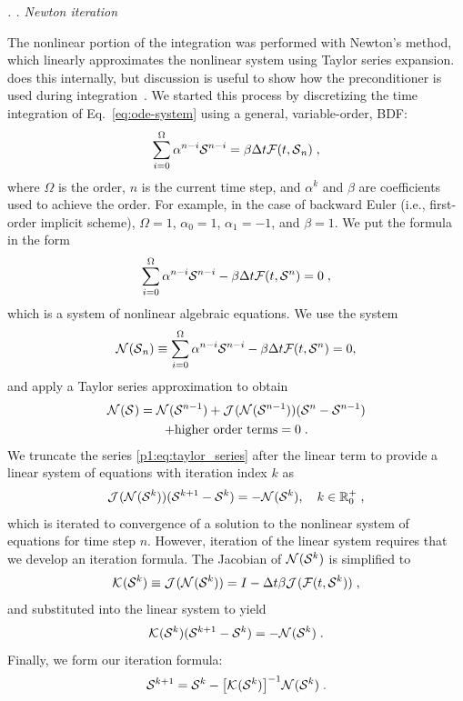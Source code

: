 \documentclass[twocolumn,10pt]{article}
\renewcommand{\subsection}%
              [1]%
              {%
               \bgroup%
               \flushleft%
               \small\em%
               \stepcounter{subsection}%
               \arabic{section}.%
               \arabic{subsection}. #1%
               \par%
               \egroup%
              }%
\newcommand{\sectionTwo}[1]{\subsection{#1} \addvspace{10pt}}
\begin{document}
\sectionTwo{Newton iteration}

The nonlinear portion of the integration was performed with Newton's method,
which linearly approximates the nonlinear system using Taylor series expansion.
\sundials{} does this internally, but discussion is useful to show how the preconditioner is used during integration~\cite{hindmarsh_sundials_2005}.
We started this process by discretizing the time integration of Eq.~\eqref{eq:ode-system} using a general, variable-order, BDF:
\begin{equation}
    \sum^{\Omega}_{i=0}{\alpha^{n-i} \mathcal{S}{}^{n-i}} = \beta \Delta t\mathcal{F}(t, \mathcal{S}{}_{n}) \;,
\end{equation}
where $\Omega$ is the order, $n$ is the current time step, and
$\alpha^{k}$ and $\beta$ are coefficients used to achieve the order.
For example, in the case of backward Euler (i.e., first-order implicit scheme), $\Omega = 1$, $\alpha_0 = 1$, $\alpha_1 = -1$, and $\beta = 1$.
We put the formula in the form
\begin{equation}
    \sum^{\Omega}_{i=0}{\alpha^{n-i} \mathcal{S}{}^{n-i}} - \beta \Delta t\mathcal{F}(t, \mathcal{S}{}^{n}) = 0 \;,
\end{equation}
which is a system of nonlinear algebraic equations.
We use the system
\begin{equation}
    \mathcal{N}^{}(\mathcal{S}{}_n) \equiv \sum^{\Omega}_{i=0}{\alpha^{n-i} \mathcal{S}{}^{n-i}} - \beta \Delta t\mathcal{F}(t, \mathcal{S}{}^{n}) = 0,
\end{equation}
and apply a Taylor series approximation to obtain
\begin{multline}
    \label{p1:eq:taylor_series}
    \mathcal{N}^{}(\mathcal{S}{}^{}) = \mathcal{N}^{}(\mathcal{S}^{n-1}) + \mathcal{J}^{}(\mathcal{N}^{}(\mathcal{S}{}^{n-1}))(\mathcal{S}{}^{n}-\mathcal{S}{}^{n-1}) \\ + \text{higher order terms} = 0 \;.
\end{multline}
We truncate the series \eqref{p1:eq:taylor_series} after the linear term
to provide a linear system of equations with iteration index $k$ as
\begin{equation}
     \mathcal{J}^{}(\mathcal{N}^{}(\mathcal{S}{}^{k}))(\mathcal{S}{}^{k+1}-\mathcal{S}{}^{k}) = -\mathcal{N}^{}(\mathcal{S}^{k}),\quad k\in\mathbb{R}^{+}_{0} \;,
\end{equation}
which is iterated to convergence of a solution to the nonlinear system of equations for time step $n$.
However, iteration of the linear system requires that we develop an iteration formula.
The Jacobian of $\mathcal{N}^{}(\mathcal{S}{}^{k})$ is simplified to
\begin{equation}
    \mathcal{K}^{}(\mathcal{S}{}^{k}) \equiv \mathcal{J}^{}(\mathcal{N}^{}(\mathcal{S}{}^{k})) = I-\Delta t \beta\mathcal{J}^{}(\mathcal{F}(t,\mathcal{S}{}^{k})) \;,
\end{equation}
and substituted into the linear system to yield
\begin{equation}
    \mathcal{K}^{}(\mathcal{S}{}^{k})(\mathcal{S}{}^{k+1}-\mathcal{S}{}^{k}) = -\mathcal{N}^{}(\mathcal{S}^{k}) \;.
\end{equation}
Finally, we form our iteration formula:
\begin{equation}
    \label{eq:newIterForm}
    \mathcal{S}{}^{k+1} = \mathcal{S}{}^{k}-\big[\mathcal{K}^{}(\mathcal{S}{}^{k})\big]^{-1}\mathcal{N}^{}(\mathcal{S}{}^{k})\;.
\end{equation}
\end{document}
